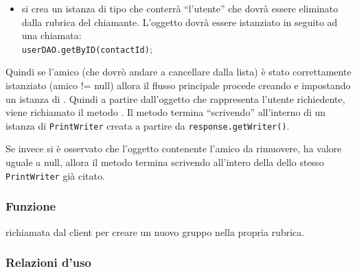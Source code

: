\begin{description}
\begin{itemize}
		\item si crea un istanza di tipo  che conterrà ``l'utente'' che dovrà essere eliminato dalla rubrica del chiamante. L'oggetto dovrà essere istanziato in seguito ad una chiamata:\\
		\verb|userDAO.getByID(contactId)|;
	\end{itemize}
	Quindi se l'amico (che dovrò andare a cancellare dalla lista) è stato correttamente istanziato (amico != null) allora il flusso principale procede creando e impostando un istanza di . Quindi a partire dall'oggetto che rappresenta l'utente richiedente, viene richiamato il metodo . Il metodo termina ``scrivendo''  all'interno di un istanza di \texttt{PrintWriter} creata a partire da \texttt{response.getWriter()}.
	
	Se invece si è osservato che l'oggetto contenente l'amico da rimuovere, ha valore uguale a null, allora il metodo termina scrivendo  all'intero della dello stesso \texttt{PrintWriter} già citato.
\end{description}



\subsubsection*{Funzione}
 richiamata dal client per creare un nuovo gruppo nella propria rubrica.

\subsubsection*{Relazioni d'uso}

